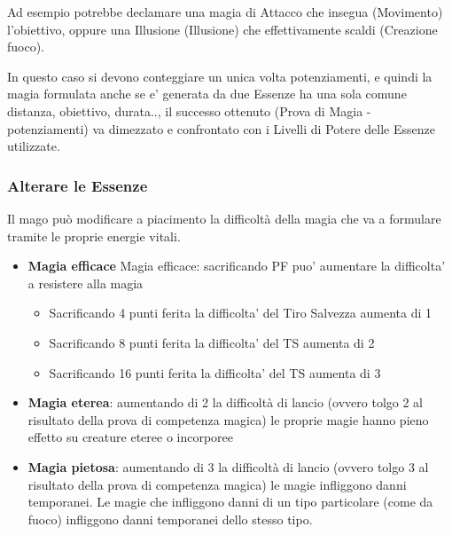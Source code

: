 \documentclass[a4paper,11pt,twoside,openany]{book}
\begin{document}
Ad esempio potrebbe declamare una magia di Attacco che insegua (Movimento) l'obiettivo, oppure una Illusione (Illusione) che effettivamente scaldi (Creazione fuoco).


In questo caso si devono conteggiare un unica volta potenziamenti, e quindi la magia formulata anche se e' generata da due Essenze ha una sola comune distanza, obiettivo, durata.., il successo ottenuto (Prova di Magia - potenziamenti) va dimezzato e confrontato con i Livelli di Potere delle Essenze utilizzate.


\subsubsection{Alterare le Essenze}

\label{alterare-le-essenze}

Il mago può modificare a piacimento la difficoltà della magia che va a formulare tramite le proprie energie vitali.

\begin{itemize}
	\item
	      \textbf{Magia efficace}
	      Magia efficace: sacrificando PF puo’ aumentare la difficolta’ a resistere alla magia
	      \begin{itemize}
      \item Sacrificando 4 punti ferita la difficolta’ del Tiro Salvezza aumenta di 1
      \item Sacrificando 8 punti ferita la difficolta’ del TS aumenta di 2

      \item Sacrificando 16 punti ferita la difficolta’ del TS aumenta di 3
	      \end{itemize}
\end{itemize}
%
\begin{itemize}
	\item
	      \textbf{Magia eterea}: aumentando di 2 la difficoltà di lancio (ovvero tolgo 2 al risultato della prova di competenza magica) le proprie magie hanno pieno effetto su creature eteree o incorporee
\end{itemize}
%
\begin{itemize}
	\item
	      \textbf{Magia pietosa}: aumentando di 3 la difficoltà di lancio (ovvero tolgo 3 al risultato della prova di competenza magica) le magie infliggono danni temporanei. Le magie che infliggono danni di un tipo particolare (come da fuoco) infliggono danni temporanei dello stesso tipo.
\end{itemize}
\end{document}
